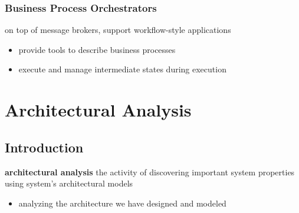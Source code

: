 \documentclass[]{article}
\theoremstyle{definition}
\begin{document}
	\subsubsection{Business Process Orchestrators}
	on top of message brokers, support workflow-style applications
	\begin{itemize}
		\item provide tools to describe business processes
		\item execute and manage intermediate states during execution
	\end{itemize}

	\section{Architectural Analysis}
	\subsection{Introduction}
	\textbf{architectural analysis} the activity of discovering important system properties using system's architectural models
	\begin{itemize}
		\item analyzing the architecture we have designed and modeled
	\end{itemize}
\end{document}
